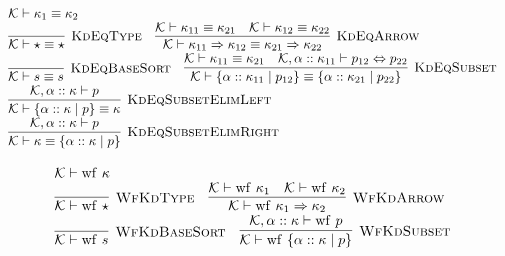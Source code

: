 \documentclass[fleqn]{article}
\begin{document}
\[
\begin{array}{l}
    \mathcal{K} \vdash \kappa_1 \equiv \kappa_2 \\
    \infer[\textsc{KdEqType}]{\mathcal{K} \vdash \star \equiv \star}{} \hspace{1em}
    \infer[\textsc{KdEqArrow}]{\mathcal{K} \vdash \kappa_{11} \Rightarrow \kappa_{12} \equiv \kappa_{21} \Rightarrow \kappa_{22}}{\mathcal{K} \vdash \kappa_{11} \equiv \kappa_{21} & \mathcal{K} \vdash \kappa_{12} \equiv \kappa_{22}} \\
    \infer[\textsc{KdEqBaseSort}]{\mathcal{K} \vdash s \equiv s}{} \hspace{1em}
    \infer[\textsc{KdEqSubset}]{\mathcal{K} \vdash \{ \alpha :: \kappa_{11} \mid p_{12} \} \equiv \{ \alpha :: \kappa_{21} \mid p_{22} \}}{\mathcal{K} \vdash \kappa_{11} \equiv \kappa_{21} & \mathcal{K}, \alpha :: \kappa_{11} \vdash p_{12} \Leftrightarrow p_{22}} \\
    \infer[\textsc{KdEqSubsetElimLeft}]{\mathcal{K} \vdash \{ \alpha :: \kappa \mid p \} \equiv \kappa}{\mathcal{K},\alpha :: \kappa \vdash p} \\
    \infer[\textsc{KdEqSubsetElimRight}]{\mathcal{K} \vdash \kappa \equiv \{ \alpha :: \kappa \mid p \}}{\mathcal{K},\alpha :: \kappa \vdash p}
\end{array}
\]

\[
\begin{array}{l}
    \mathcal{K} \vdash \mathrm{wf}~\kappa \\
    \infer[\textsc{WfKdType}]{\mathcal{K} \vdash \mathrm{wf}~\star}{} \hspace{1em}
    \infer[\textsc{WfKdArrow}]{\mathcal{K} \vdash \mathrm{wf}~\kappa_1 \Rightarrow \kappa_2}{\mathcal{K} \vdash \mathrm{wf}~\kappa_1 & \mathcal{K} \vdash \mathrm{wf}~\kappa_2} \\
    \infer[\textsc{WfKdBaseSort}]{\mathcal{K} \vdash \mathrm{wf}~s}{} \hspace{1em}
    \infer[\textsc{WfKdSubset}]{\mathcal{K} \vdash \mathrm{wf}~\{ \alpha :: \kappa \mid p \}}{\mathcal{K},\alpha :: \kappa \vdash \mathrm{wf}~p}
\end{array}
\]
\end{document}
